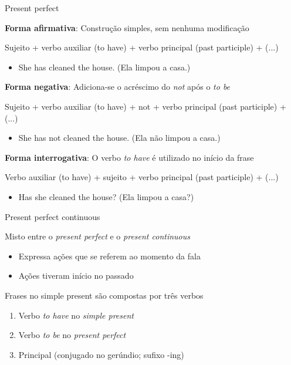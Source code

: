 \documentclass[compress,mathserif,xcolor=table]{beamer}
\begin{document}
\begin{frame}{Present perfect}

\textbf{Forma afirmativa}: Construção simples, sem nenhuma modificação

Sujeito + verbo auxiliar (to have) + verbo principal (past participle) + (...)
\begin{itemize}
    \item She has cleaned the house. (Ela limpou a casa.)
\end{itemize}

\vspace{0.25cm}

\textbf{Forma negativa}: Adiciona-se o acréscimo do \textit{not} após o \textit{to be}

Sujeito + verbo auxiliar (to have) + not + verbo principal (past participle) + (...)
\begin{itemize}
    \item She has not cleaned the house. (Ela não limpou a casa.)
\end{itemize}

\vspace{0.25cm}

\textbf{Forma interrogativa}: O verbo \textit{to have} é utilizado no início da frase

Verbo auxiliar (to have) + sujeito + verbo principal (past participle) + (...)
\begin{itemize}
    \item Has she cleaned the house? (Ela limpou a casa?)
\end{itemize}

\end{frame}





\begin{frame}{Present perfect continuous}

Misto entre o \textit{present perfect} e o \textit{present continuous}
\begin{itemize}
    \item Expressa ações que se referem ao momento da fala
    \item Ações tiveram início no passado
\end{itemize}

\vspace{0.5cm}

Frases no simple present são compostas por três verbos
\begin{enumerate}
    \item Verbo \textit{to have} no \textit{simple present}
    \item Verbo \textit{to be} no \textit{present perfect}
    \item Principal (conjugado no gerúndio; sufixo -ing)
\end{enumerate}

\end{frame}
\end{document}
